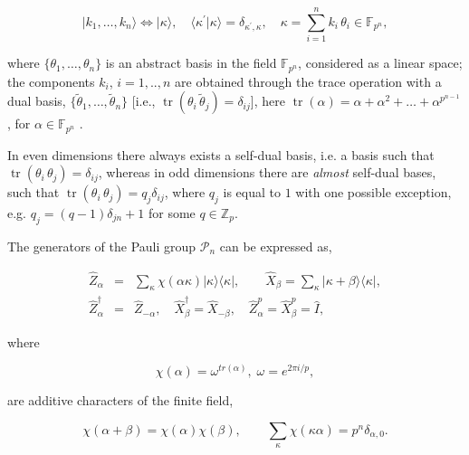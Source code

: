 \documentclass[quantumrep,article,submit,pdftex,moreauthors]{Definitions/mdpi}
\DeclareMathOperator{\tr}{tr}
\begin{document}
\begin{equation}
  |k_{1},\ldots ,k_{n}\rangle \Leftrightarrow |\kappa \rangle,
  \quad \langle
  \kappa^{\prime}|\kappa \rangle =\delta _{\kappa ^{\prime },\kappa },
  \quad
  \kappa =\sum_{i=1}^{n}k_{i}\,\theta _{i}\in \mathbb{F}_{p^{n}},
  \label{basis}
\end{equation}%

where $\{\theta_{1},\ldots ,\theta_{n}\}$ is an abstract basis in the
field $\mathbb{F}_{p^{n}}$, considered as a linear space; the components
$k_{i}$, $i=1,..,n$ are obtained through the trace operation with a dual basis,
$\{\tilde{\theta}_{1},\ldots ,\tilde{\theta}_{n}\}$ [i.e., $\tr(\theta
_{i}\,\tilde{\theta}_{j})=\delta _{ij}$], here $\tr(\alpha )=\alpha +\alpha
^{2}+\ldots +\alpha ^{p^{n-1}}$, for $\alpha \in \mathbb{F}_{p^{n}}$ \cite{FF}.

In even dimensions there always exists a self-dual basis, i.e. a basis such that
$\tr(\theta _{i}\,\theta _{j})=\delta _{ij}$, whereas in odd dimensions there
are \textit{almost} self-dual bases, such that $\tr(\theta _{i}\,\theta
_{j})=q_{j}\delta _{ij}$, where $q_{j}$ is equal to $1$ with one possible
exception, e.g. $q_{j}=(q-1)\delta_{jn}+1$ for some $q \in \mathbb Z_p$.

The generators of the Pauli group $\mathcal{P}_{n}$ can be expressed as, 

\begin{eqnarray}
  \hat{Z}_{\alpha } &=& \sum_{\kappa }\chi \left( \alpha \kappa \right) |\kappa
  \rangle \langle \kappa|,
  \qquad \hat{X}_{\beta }=\sum_{\kappa }|\kappa + \beta \rangle \langle \kappa|,
  \label{XZ} \\
  \hat{Z}_{\alpha }^{\dagger } &=& \hat{Z}_{-\alpha },
  \quad \hat{X}_{\beta }^{\dagger} = \hat{X}_{-\beta },
  \quad \hat{Z}_{\alpha}^{p} = \hat{X}_{\beta}^{p} = \hat{I},
\end{eqnarray}

where

\begin{equation*}
\chi \left( \alpha \right)
  = \omega ^{tr\left( \alpha \right) },\;\omega
  = e^{2\pi i/p},
\end{equation*}

are additive characters of the finite field, 

\begin{equation*}
  \chi \left( \alpha +\beta \right)
  = \chi \left( \alpha \right) \chi \left( \beta \right),
  \qquad \sum_{\kappa }\chi \left( \kappa \alpha \right)
  = p^{n}\delta _{\alpha, 0}.
\end{equation*}
\end{document}
